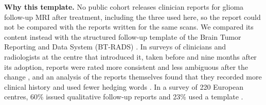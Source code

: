 \documentclass[11pt,a4paper]{article}
\begin{document}
\textbf{Why this template.} No public cohort releases clinician reports for glioma follow-up MRI after treatment,
including the three used here, so the report could not be compared with the reports written for the same scans. We
compared its content instead with the structured follow-up template of the Brain Tumor Reporting and Data System
(BT-RADS) \citep{weinberg2018,btradsweb}. In surveys of clinicians and radiologists at the centre that introduced it, taken before and
nine months after its adoption, reports were rated more consistent and less ambiguous after the change
\citep{gore2019}, and an analysis of the reports themselves found that they recorded more clinical history and used
fewer hedging words \citep{zhang2020}. In a survey of 220 European
centres, 60\% issued qualitative follow-up reports and 23\% used a template \citep{thust2018}.
\end{document}
